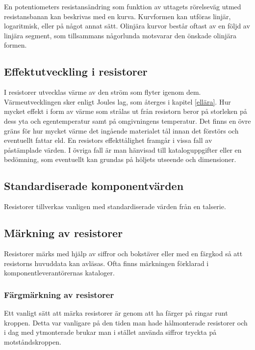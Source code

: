 En potentiometers resistansändring som funktion av uttagets rörelseväg utmed 
resistansbanan kan beskrivas med en kurva. Kurvformen kan utföras linjär,
logaritmisk, eller på något annat sätt. Olinjära kurvor består oftast av en följd av 
linjära segment, som tillsammans någorlunda motsvarar den önskade olinjära 
formen.

\subsection{Effektutveckling i resistorer}

I resistorer utvecklas värme av den ström som flyter igenom dem. Värmeutvecklingen
sker enligt Joules lag, som återges i kapitel \ref{ellära}. Hur mycket effekt i form av
värme som strålas ut från resistorn beror på storleken på dess yta och
egentemperatur samt på omgivningens temperatur. Det finns en övre gräns för hur
mycket värme det ingående materialet tål innan det förstörs och eventuellt fattar
eld. En resistors effekttålighet framgår i vissa fall av påstämplade värden.
I övriga fall är man hänvisad till kataloguppgifter eller en bedömning, som
eventuellt kan grundas på höljets utseende och dimensioner.

\subsection{Standardiserade komponentvärden}

Resistorer tillverkas vanligen med standardiserade värden från en talserie.

\subsection{Märkning av resistorer}
\label{färgmärkning}

Resistorer märks med hjälp av siffror och bokstäver eller med en färgkod så att
resistorns huvuddata kan avläsas.
Ofta finns märkningen förklarad i komponentleverantörernas kataloger.

\subsubsection{Färgmärkning av resistorer}

Ett vanligt sätt att märka resistorer är genom att ha färger på ringar
runt kroppen. Detta var vanligare på den tiden man hade hålmonterade
resistorer och i dag med ytmonterade brukar man i stället använda
siffror tryckta på motståndskroppen.

